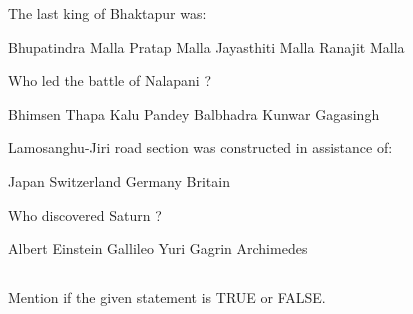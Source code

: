 \begin{questions}
\question The last king of Bhaktapur was:
  \begin{choices}
  \choice Bhupatindra Malla
  \choice Pratap Malla
  \choice Jayasthiti Malla
  \choice Ranajit Malla
  \end{choices}

\question Who led the battle of Nalapani ?
  \begin{choices}
  \choice Bhimsen Thapa
  \choice Kalu Pandey
  \choice Balbhadra Kunwar
  \choice Gagasingh
  \end{choices}

\question Lamosanghu-Jiri road section was constructed in assistance of:
  \begin{choices}
  \choice Japan
  \choice Switzerland
  \choice Germany
  \choice Britain
  \end{choices}

\question Who discovered Saturn ?
  \begin{choices}
  \choice Albert Einstein
  \choice Gallileo
  \choice Yuri Gagrin
  \choice Archimedes
  \end{choices}

\end{questions}

\subsection*{}

\begin{questions}

\question Mention if the given statement is TRUE or FALSE.

\end{questions}

